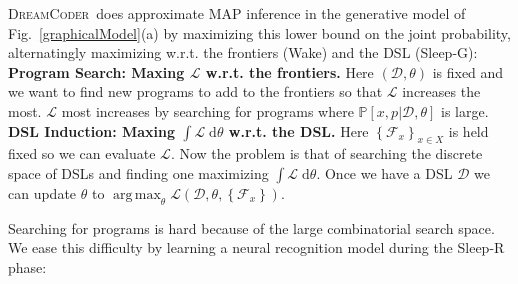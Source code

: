 \documentclass{article}
\newcommand{\system}{\textsc{DreamCoder}~}
\newcommand{\lowerBound}{\mathscr{L}}
\DeclareMathOperator*{\argmax}{arg\,max} %
\newcommand{\probability}{\mathds{P}} %
\begin{document}

\system does approximate MAP inference in the generative model of Fig.~\ref{graphicalModel}(a) by maximizing this lower bound on the joint probability,
alternatingly maximizing w.r.t. the frontiers (Wake) and the DSL (Sleep-G):
\\\noindent \textbf{Program Search: Maxing $\lowerBound$ w.r.t. the frontiers.} Here $(\mathcal{D},\theta)$ is fixed and we
want to find new programs to add to  the frontiers so that $\lowerBound$ increases the most.
$\lowerBound$ most increases by searching for programs where $\probability[x,p|\mathcal{D},\theta]$
is large.
\\\noindent \textbf{DSL Induction: Maxing $\int \lowerBound\;\mathrm{d}\theta$ w.r.t. the DSL.} Here $\left\{\mathcal{F}_x \right\}_{x\in X}$ is held fixed so we can evaluate $\lowerBound$. Now the problem is that of searching the discrete space of DSLs and finding one maximizing $\int \lowerBound\;\mathrm{d}\theta$.
Once we have a DSL $\mathcal{D}$ we can update $\theta$ to $\argmax_\theta \lowerBound(\mathcal{D},\theta,\left\{\mathcal{F}_x \right\})$. 


Searching for programs is hard because
of the large combinatorial search space. We ease this difficulty by learning a neural recognition model
during the Sleep-R phase:
\end{document}
